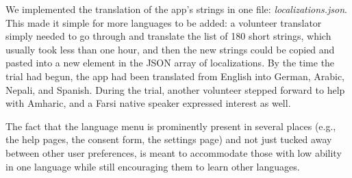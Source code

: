 We implemented the translation of the app's strings in one file: \textit{localizations.json}. This made it simple for more languages to be added: a volunteer translator simply needed to go through and translate the list of 180 short strings, which usually took less than one hour, and then the new strings could be copied and pasted into a new element in the JSON array of localizations. By the time the trial had begun, the app had been translated from English into German, Arabic, Nepali, and Spanish. During the trial, another volunteer stepped forward to help with Amharic, and a Farsi native speaker expressed interest as well.

The fact that the language menu is prominently present in several places (e.g., the help pages, the consent form, the settings page) and not just tucked away between other user preferences, is meant to accommodate those with low ability in one language while still encouraging them to learn other languages.



